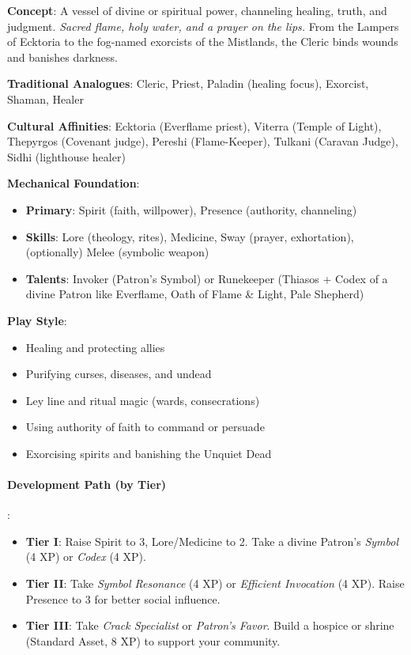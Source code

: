 \textbf{Concept}: A vessel of divine or spiritual power, channeling healing, truth, and judgment. \emph{Sacred flame, holy water, and a prayer on the lips.} From the Lampers of Ecktoria to the fog-named exorcists of the Mistlands, the Cleric binds wounds and banishes darkness.

\textbf{Traditional Analogues}: Cleric, Priest, Paladin (healing focus), Exorcist, Shaman, Healer

\textbf{Cultural Affinities}: Ecktoria (Everflame priest), Viterra (Temple of Light), Thepyrgos (Covenant judge), Pereshi (Flame-Keeper), Tulkani (Caravan Judge), Sidhi (lighthouse healer)

\textbf{Mechanical Foundation}:
\begin{itemize}
\item \textbf{Primary}: Spirit (faith, willpower), Presence (authority, channeling)
\item \textbf{Skills}: Lore (theology, rites), Medicine, Sway (prayer, exhortation), (optionally) Melee (symbolic weapon)
\item \textbf{Talents}: Invoker (Patron's Symbol) or Runekeeper (Thiasos + Codex of a divine Patron like Everflame, Oath of Flame \& Light, Pale Shepherd)
\end{itemize}

\textbf{Play Style}:
\begin{itemize}
\item Healing and protecting allies
\item Purifying curses, diseases, and undead
\item Ley line and ritual magic (wards, consecrations)
\item Using authority of faith to command or persuade
\item Exorcising spirits and banishing the Unquiet Dead
\end{itemize}

\paragraph{Development Path (by Tier)}:
\begin{itemize}
\item \textbf{Tier I}: Raise Spirit to 3, Lore/Medicine to 2. Take a divine Patron's \emph{Symbol} (4 XP) or \emph{Codex} (4 XP).
\item \textbf{Tier II}: Take \emph{Symbol Resonance} (4 XP) or \emph{Efficient Invocation} (4 XP). Raise Presence to 3 for better social influence.
\item \textbf{Tier III}: Take \emph{Crack Specialist} or \emph{Patron's Favor}. Build a hospice or shrine (Standard Asset, 8 XP) to support your community.
\end{itemize}

